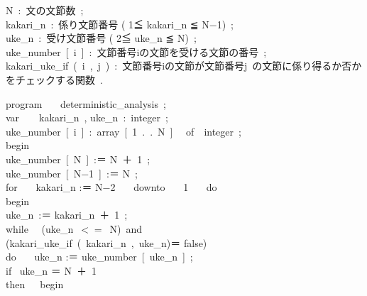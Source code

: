 \begin{center}\begin{minipage}{120mm}
\vspace*{3mm}
\noindent N\ :\ 文の文節数\ ; \\
kakari\_n\ :\ 係り文節番号 ( 1≦ kakari\_n ≦  N−1)\ ;\\
uke\_n\ :\ 受け文節番号 ( 2≦ uke\_n ≦  N)\ ;\\
uke\_number\ [\ i\ ]\ :\ 文節番号iの文節を受ける文節の番号\ ;\\
kakari\_uke\_if\ (\ i\ ,\ j\ )\ :\ 文節番号iの文節が文節番号j\ の文節に係り得るか否かをチェックする関数\ .
\bigskip

\noindent program  \ \ \ deterministic\_analysis\ ;    \\
\hspace*{7mm}    var\ \ \ \   kakari\_n\ ,  uke\_n\ :\ integer\ ;\\
\hspace*{16mm}               uke\_number\ [\ i\ ]\ :\ array\ [\ 1\ .\ .\ N\ ] \ \ of\ \  integer\ ;\\
                  begin    \\
\hspace*{10mm}         uke\_number\ [\ N\ ]\  :＝ N\ ＋\  1\ ; \\
\hspace*{10mm}         uke\_number\ [\ N−1\ ]\  :＝ N\ ; \\
\hspace*{10mm}         for \ \ \ kakari\_n :＝ N−2 \ \ \   downto \ \ \ 1 \ \ \ do\\
\hspace*{15mm}         begin \\
\hspace*{20mm}               uke\_n\ :＝ kakari\_n\ ＋\  1\ ;\\
\hspace*{20mm}               while \ \ (uke\_n\ $<=$\ N)\ and \\ 
\hspace*{35mm}(kakari\_uke\_if\ (\ kakari\_n\ ,\ uke\_n)＝ false)\ \ \\
\hspace*{20mm}          do \ \ \ uke\_n :＝ uke\_number\ [\ uke\_n\ ]\ ; \\
\hspace*{20mm}               if   \hspace*{1mm} \ uke\_n ＝ N\ ＋\  1\ \hspace*{3mm}\\
\hspace*{20mm}                    then\ \  \ begin \\ 

\end{minipage}
\end{center}
